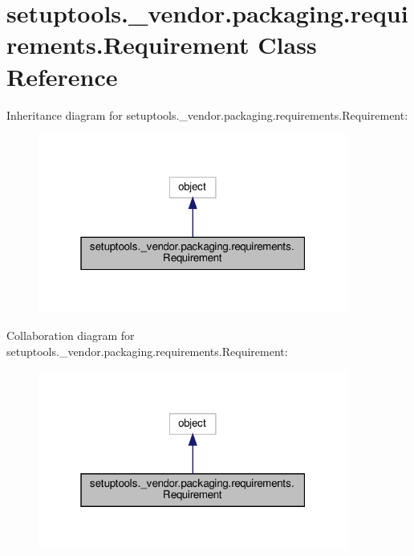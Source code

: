\hypertarget{classsetuptools_1_1__vendor_1_1packaging_1_1requirements_1_1Requirement}{}\section{setuptools.\+\_\+vendor.\+packaging.\+requirements.\+Requirement Class Reference}
\label{classsetuptools_1_1__vendor_1_1packaging_1_1requirements_1_1Requirement}


Inheritance diagram for setuptools.\+\_\+vendor.\+packaging.\+requirements.\+Requirement\+:
\nopagebreak
\begin{figure}[H]
\begin{center}
\leavevmode
\includegraphics[width=289pt]{classsetuptools_1_1__vendor_1_1packaging_1_1requirements_1_1Requirement__inherit__graph}
\end{center}
\end{figure}


Collaboration diagram for setuptools.\+\_\+vendor.\+packaging.\+requirements.\+Requirement\+:
\nopagebreak
\begin{figure}[H]
\begin{center}
\leavevmode
\includegraphics[width=289pt]{classsetuptools_1_1__vendor_1_1packaging_1_1requirements_1_1Requirement__coll__graph}
\end{center}
\end{figure}
